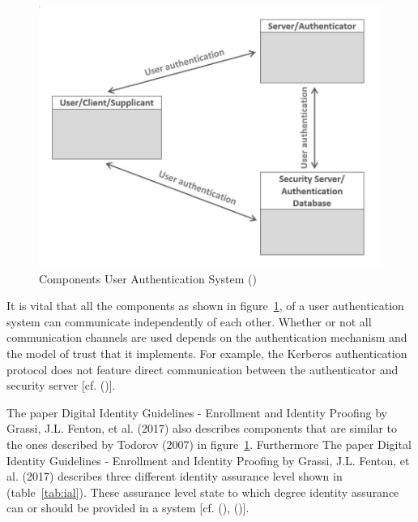 \begin{figure}[h]
	\centering
	\includegraphics[width=0.8\linewidth]{images/identity_proofing_architectur}
	\caption[Componets Authentication]{Components User Authentication System (\cite{Todorov:2007:MUI})}
	\label{fig:componentsuserauthenticationsystem}
\end{figure}

It is vital that all the components as shown in figure~\ref{fig:componentsuserauthenticationsystem}, of a user authentication system can communicate independently of each other. Whether or not all communication channels are used depends on the authentication mechanism and the model of trust that it implements. For example, the Kerberos authentication protocol does not feature direct communication between the authenticator and security server [cf. (\cite{Todorov:2007:MUI})]. 

The paper Digital Identity Guidelines - Enrollment and Identity Proofing by Grassi, J.L. Fenton, et al. (2017) also describes components that are similar to the ones described by Todorov (2007) in figure~\ref{fig:componentsuserauthenticationsystem}. Furthermore The paper Digital Identity Guidelines - Enrollment and Identity Proofing by Grassi, J.L. Fenton, et al. (2017) describes three different identity assurance level shown in (table~\ref{tab:ial}). These assurance level state to which degree identity assurance can or should be provided in a system [cf. (\cite{NIST:2017:DIGEIP}), (\cite{Todorov:2007:MUI})]. 


